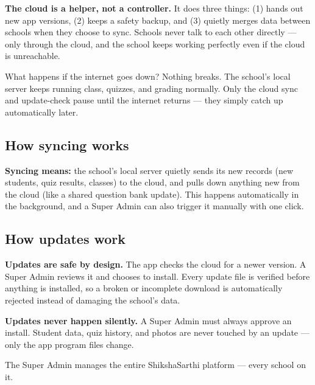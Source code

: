 \documentclass[12pt,a4paper]{article}
\begin{document}
\begin{infobox}
\textbf{The cloud is a helper, not a controller.} It does three things: (1) hands out
new app versions, (2) keeps a safety backup, and (3) quietly merges data between
schools when they choose to sync. Schools never talk to each other directly --- only
through the cloud, and the school keeps working perfectly even if the cloud is
unreachable.
\end{infobox}

\begin{qabox}{What happens if the internet goes down?}
Nothing breaks. The school's local server keeps running class, quizzes, and grading
normally. Only the cloud sync and update-check pause until the internet returns ---
they simply catch up automatically later.
\end{qabox}

\subsection*{How syncing works}
\begin{tipbox}
\textbf{Syncing means:} the school's local server quietly sends its new records
(new students, quiz results, classes) to the cloud, and pulls down anything new
from the cloud (like a shared question bank update). This happens automatically
in the background, and a Super Admin can also trigger it manually with one click.
\end{tipbox}

\subsection*{How updates work}
\begin{tipbox}
\textbf{Updates are safe by design.} The app checks the cloud for a newer version.
A Super Admin reviews it and chooses to install. Every update file is verified
before anything is installed, so a broken or incomplete download is automatically
rejected instead of damaging the school's data.
\end{tipbox}

\begin{warnbox}
\textbf{Updates never happen silently.} A Super Admin must always approve an
install. Student data, quiz history, and photos are never touched by an update ---
only the app program files change.
\end{warnbox}

\newpage
\begin{roleboxSA}
The Super Admin manages the entire ShikshaSarthi platform --- every school on it.
\end{roleboxSA}
\end{document}
